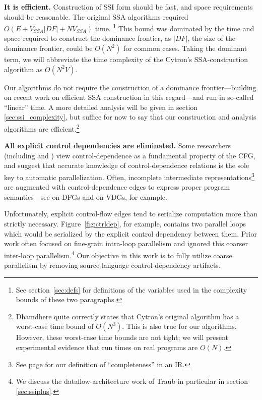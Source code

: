 \documentclass[12pt,titlepage,twoside]{article}
\begin{document}
\textbf{It is efficient.}  Construction of SSI form should be fast,
and space requirements should be reasonable.  The original SSA
algorithms required $O(E+V_{SSA}|{DF}|+NV_{SSA})$ time.%
\footnote{See section~\ref{sec:defs} for definitions of the
variables used in the complexity bounds of these two paragraphs.}
This bound
was dominated by the time and space required to construct the
dominance frontier, as $|{DF}|$, the size of the dominance frontier,
could be $O(N^2)$ for common cases.  Taking the dominant term, we will
abbreviate the time complexity of the Cytron's SSA-construction
algorithm as $O(N^2 V)$.

Our algorithms do not require the construction of a dominance
frontier---building on recent work on efficient SSA construction in
this regard---and run in so-called ``linear'' time.  A more
detailed analysis will be given in section \ref{sec:ssi_complexity},
but suffice for now to say that our construction and analysis
algorithms are efficient.\footnote{Dhamdhere \cite{dhamdhere92:large} quite
correctly states that Cytron's original algorithm has a worst-case
time bound of $O(N^3)$.  This is also true for our algorithms.
However, these worst-case time bounds are not tight; we will present
experimental evidence that run times on real programs are $O(N)$.}
       

\textbf{All explicit control dependencies are eliminated.}
Some researchers (including \cite{appel:modern} and
\cite{pingali97:apt}) view control-dependence as a fundamental
property of the CFG, and \cite{ballance90:pdw,appel:modern} suggest
that accurate knowledge of control-dependence relations is the sole
key to automatic parallelization.  Often, incomplete intermediate
representations\footnote{See page \pageref{sec:complete} for our
definition of ``completeness'' in an IR.} are augmented with
control-dependence edges to express proper program semantics---see
\cite{johnson93:dfg} on DFGs and \cite{weise94:vdg} on VDGs, for
example.

Unfortunately, explicit control-flow edges tend to serialize
computation more than strictly necessary.  Figure~\vref{fig:ctrldep},
for example, contains two parallel loops which would be serialized by
the explicit control dependency between them.  Prior work often
focused on fine-grain intra-loop parallelism and ignored this coarser
inter-loop parallelism.\footnote{We discuss the dataflow-architecture
work of Traub \cite{traub86:ttda} in particular in section
\ref{sec:ssiplus}.} Our objective in this work is to fully utilize
coarse parallelism by removing source-language control-dependency artifacts.
\end{document}

